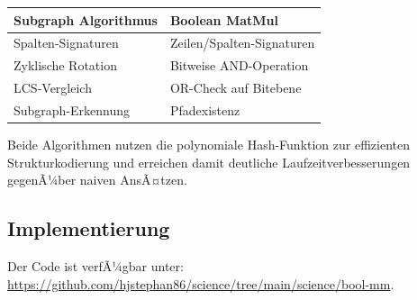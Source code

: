 ﻿\documentclass[a4paper,12pt]{article}
\theoremstyle{definition}
\begin{document}
\begin{center}
	\begin{tabular}{|l|l|}
		\hline
		\textbf{Subgraph Algorithmus} & \textbf{Boolean MatMul} \\
		\hline
		Spalten-Signaturen & Zeilen/Spalten-Signaturen \\
		Zyklische Rotation & Bitweise AND-Operation \\
		LCS-Vergleich & OR-Check auf Bitebene \\
		Subgraph-Erkennung & Pfadexistenz \\
		\hline
	\end{tabular}
\end{center}

Beide Algorithmen nutzen die polynomiale Hash-Funktion zur effizienten Strukturkodierung und erreichen damit deutliche Laufzeitverbesserungen gegenÃ¼ber naiven AnsÃ¤tzen.

\subsection{Implementierung}

Der Code ist verfÃ¼gbar unter: \url{https://github.com/hjstephan86/science/tree/main/science/bool-mm}.	
\end{document}
